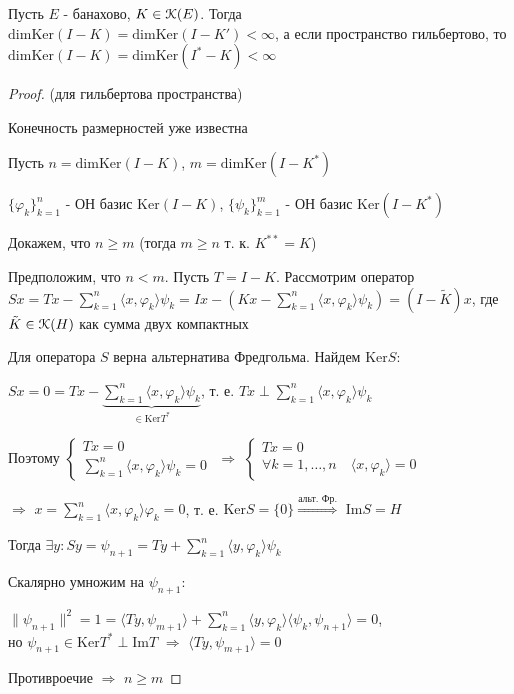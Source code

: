\documentclass[a4paper,12pt]{report}
\newcommand*{\hm}[1]{#1\nobreak\discretionary{}%
            {\hbox{$\mathsurround=0pt #1$}}{}}
\begin{document}
\begin{thm}
Пусть $E$ - банахово, $K\hm\in\EuScript K(E)$. Тогда $\mathrm{dimKer}(I-K)=\mathrm{dimKer}(I-K')<\infty$, а если пространство гильбертово, то $\mathrm{dimKer}(I-K)=\mathrm{dimKer}(I^*-K)<\infty$
\end{thm}
\begin{proof}
(для гильбертова пространства)

Конечность размерностей уже известна

Пусть $n=\mathrm{dimKer}(I-K)$, $m=\mathrm{dimKer}(I-K^*)$

$\{\varphi_k\}_{k=1}^n$ - ОН базис $\mathrm{Ker}(I-K)$, $\{\psi_k\}_{k=1}^m$ - ОН базис $\mathrm{Ker}(I-K^*)$

Докажем, что $n\ge m$ (тогда $m\ge n$ т. к. $K^{**}=K$)

Предположим, что $n<m$. Пусть $T=I-K$. Рассмотрим оператор $Sx=Tx-\sum\limits_{k=1}^n\langle x,\varphi_k\rangle\psi_k=Ix-(Kx-\sum\limits_{k=1}^n\langle x,\varphi_k\rangle\psi_k)=(I-\tilde K)x$, где $\tilde K\in\EuScript K(H)$ как сумма двух компактных

Для оператора $S$ верна альтернатива Фредгольма. Найдем $\mathrm{Ker}S\colon$

$Sx=0=Tx-\underbrace{\sum\limits_{k=1}^n\langle x,\varphi_k\rangle\psi_k}_{\in\mathrm{Ker}T^*}$, т. е. $Tx\perp\sum\limits_{k=1}^n\langle x,\varphi_k\rangle\psi_k$

Поэтому $\begin{cases} Tx=0\\\sum\limits_{k=1}^n\langle x,\varphi_k\rangle\psi_k=0\end{cases}$ $\Rightarrow$ $\begin{cases} Tx=0\\\forall k=1,\ldots,n\quad\langle x,\varphi_k\rangle=0\end{cases}$

$\Rightarrow$ $x=\sum\limits_{k=1}^n\langle x,\varphi_k\rangle\varphi_k=0$, т. е. $\mathrm{Ker}S=\{0\}\stackrel{\text{альт. Фр.}}{\Rightarrow}$ $\mathrm{Im}S=H$

Тогда $\exists y\colon Sy=\psi_{n+1}=Ty+\sum\limits_{k=1}^n\langle y,\varphi_k\rangle\psi_k$

Скалярно умножим на $\psi_{n+1}$:

$\|\psi_{n+1}\|^2=1=\langle Ty,\psi_{m+1}\rangle+\sum\limits_{k=1}^n\langle y,\varphi_k\rangle\langle\psi_k,\psi_{n+1}\rangle=0$, \\но $\psi_{n+1}\in\mathrm{Ker} T^*\perp\mathrm{Im}T$ $\Rightarrow$ $\langle Ty,\psi_{m+1}\rangle=0$

Противроечие $\Rightarrow$ $n\ge m$
\end{proof}
 
\end{document}
